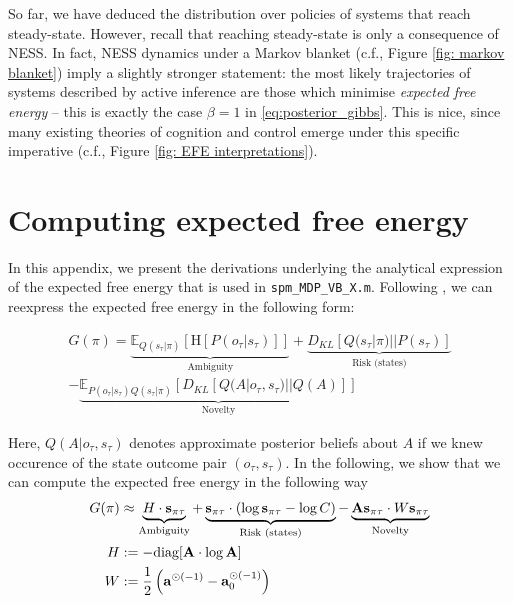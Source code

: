 \documentclass[review,12pt,authoryear]{elsarticle}
\begin{document}
So far, we have deduced the distribution over policies of systems that reach steady-state. However, recall that reaching steady-state is only a consequence of NESS. In fact, NESS dynamics under a Markov blanket (c.f., Figure \ref{fig: markov blanket}) imply a slightly stronger statement: the most likely trajectories of systems described by active inference are those which minimise \textit{expected free energy} \citep{parrMarkovBlanketsInformation2019,fristonFreeEnergyPrinciple2019} -- this is exactly the case $\beta =1$ in \eqref{eq:posterior_gibbs}. This is nice, since many existing theories of cognition and control emerge under this specific imperative (c.f., Figure \ref{fig: EFE interpretations}).

\section{Computing expected free energy}
	
	In this appendix, we present the derivations underlying the analytical expression of the expected free energy that is used in \texttt{spm\_MDP\_VB\_X.m}. Following \citep{parrComputationalNeurologyActive2019}, we can reexpress the expected free energy in the following form:
	
	\begin{multline}
	\label{eq: G new expression}
		G(\pi)= \underbrace{\mathbb E_{Q(s_\tau|\pi)} [\text{H}[P(o_\tau |s_\tau)]]}_{\text{Ambiguity}} + \underbrace{D_{KL}[Q(s_\tau |\pi)||P(s_\tau)]}_{\text{Risk (states)}}  \\
		- \underbrace{\mathbb E_{P(o_\tau |s_\tau)Q(s_\tau|\pi)}[D_{KL}[Q(A|o_\tau,s_\tau)||Q(A)]]}_{\text{Novelty}}
	\end{multline}
	
	 Here, $Q(A|o_\tau,s_\tau)$ denotes approximate posterior beliefs about $A$ if we knew occurence of the state outcome pair $(o_\tau,s_\tau)$. In the following, we show that we can compute the expected free energy in the following way
	 \begin{equation}
	 \label{eq: sol efe computation}
	     \begin{split}
	         G(\pi) &\approx \underbrace{H \cdot \bold s_{\pi \tau}}_{\text{Ambiguity}} + \underbrace{ \bold s_{\pi \tau} \cdot (\log \bold s_{\pi \tau}-\log C)}_{\text{Risk (states)}} - \underbrace{\bold A \bold s_{\pi \tau} \cdot W \bold s_{\pi \tau}}_{\text{Novelty}} \\
             H &:= - \text{diag} [\bold A\cdot \log \bold A] \\
             W &:= \frac 1 2 \left(\bold a ^{\odot (-1)}-\bold a_0^{\odot (-1)}\right)
	     \end{split}
	 \end{equation}
    
\end{document}
